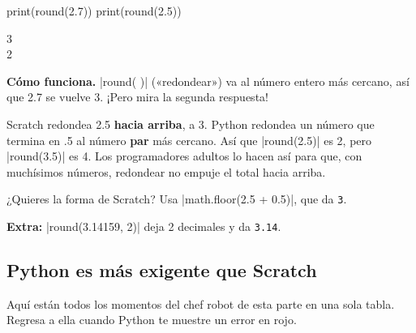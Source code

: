 \begin{tcbraster}[raster columns=1, raster valign=center, raster row skip=6pt]
\begin{tcolorbox}[colback=white, colframe=white, boxrule=0pt, valign=center]
\begin{scratch}
\end{scratch}
\end{tcolorbox}
\begin{tcolorbox}[colback=white, colframe=white, boxrule=0pt, left=0pt, right=0pt, top=0pt, bottom=0pt, valign=center]
\begin{code}
print(round(2.7))
print(round(2.5))
\end{code}
\begin{outputbox}
3\\
2
\end{outputbox}
\end{tcolorbox}
\end{tcbraster}

\textbf{Cómo funciona.} \py|round( )| («redondear») va al número entero más cercano, así que 2.7 se vuelve 3. ¡Pero mira la segunda respuesta!

\begin{watchout}
Scratch redondea 2.5 \textbf{hacia arriba}, a 3. Python redondea un número que termina en .5 al número \textbf{par} más cercano. Así que \py|round(2.5)| es 2, pero \py|round(3.5)| es 4. Los programadores adultos lo hacen así para que, con muchísimos números, redondear no empuje el total hacia arriba.

¿Quieres la forma de Scratch? Usa \py|math.floor(2.5 + 0.5)|, que da \texttt{3}.

\textbf{Extra:} \py|round(3.14159, 2)| deja 2 decimales y da \texttt{3.14}.
\end{watchout}

\subsection*{Python es más exigente que Scratch}

Aquí están todos los momentos del chef robot de esta parte en una sola tabla. Regresa a ella cuando Python te muestre un error en rojo.

